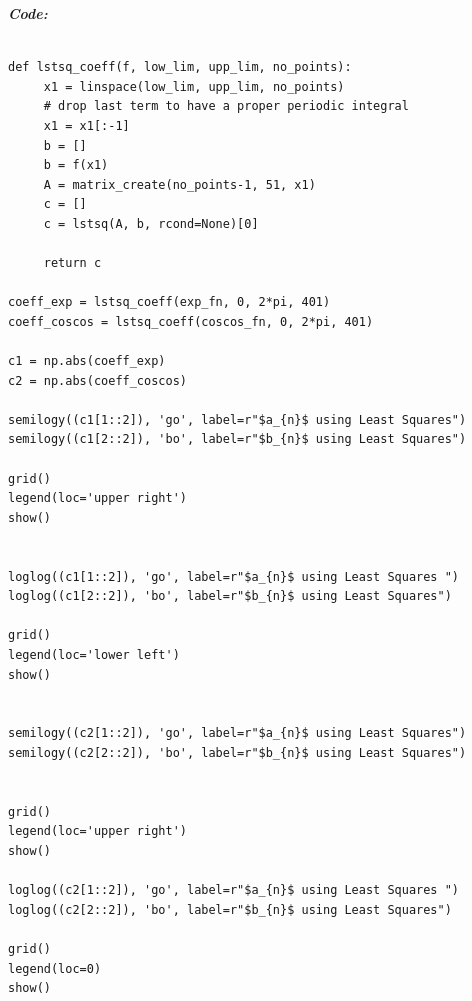 \documentclass[11pt, a4paper]{article}
\begin{document}
    \textit{\textbf{Code:}}
    \begin{lstlisting}

def lstsq_coeff(f, low_lim, upp_lim, no_points):
     x1 = linspace(low_lim, upp_lim, no_points)
     # drop last term to have a proper periodic integral
     x1 = x1[:-1]
     b = []
     b = f(x1)
     A = matrix_create(no_points-1, 51, x1)
     c = []
     c = lstsq(A, b, rcond=None)[0] 

     return c

coeff_exp = lstsq_coeff(exp_fn, 0, 2*pi, 401)
coeff_coscos = lstsq_coeff(coscos_fn, 0, 2*pi, 401)

c1 = np.abs(coeff_exp)
c2 = np.abs(coeff_coscos)

semilogy((c1[1::2]), 'go', label=r"$a_{n}$ using Least Squares")
semilogy((c1[2::2]), 'bo', label=r"$b_{n}$ using Least Squares")

grid()
legend(loc='upper right')
show()


loglog((c1[1::2]), 'go', label=r"$a_{n}$ using Least Squares ")
loglog((c1[2::2]), 'bo', label=r"$b_{n}$ using Least Squares")

grid()
legend(loc='lower left')
show()


semilogy((c2[1::2]), 'go', label=r"$a_{n}$ using Least Squares")
semilogy((c2[2::2]), 'bo', label=r"$b_{n}$ using Least Squares")


grid()
legend(loc='upper right')
show()

loglog((c2[1::2]), 'go', label=r"$a_{n}$ using Least Squares ")
loglog((c2[2::2]), 'bo', label=r"$b_{n}$ using Least Squares")

grid()
legend(loc=0)
show()
    \end{lstlisting}
\break
\end{document}
